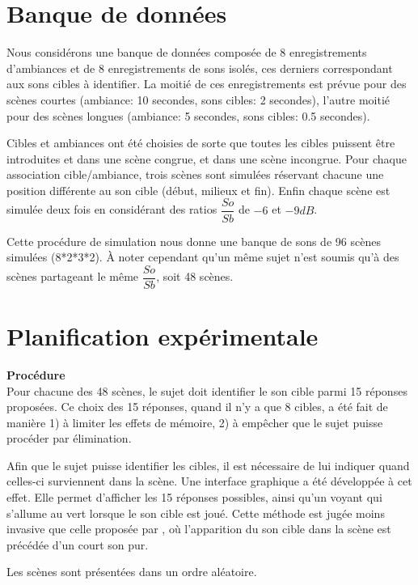 \section{Banque de données}

Nous considérons une banque de données composée de 8 enregistrements d'ambiances et de 8 enregistrements de sons isolés, ces derniers correspondant aux sons cibles à identifier. La moitié de ces enregistrements est prévue pour des scènes courtes (ambiance: 10 secondes, sons cibles: 2 secondes), l'autre moitié pour des scènes longues (ambiance: 5 secondes, sons cibles: 0.5 secondes).

Cibles et ambiances ont été choisies de sorte que toutes les cibles puissent être introduites et dans une scène congrue, et dans une scène incongrue. Pour chaque association cible/ambiance, trois scènes sont simulées réservant chacune une position différente au son cible (début, milieux et fin). Enfin chaque scène est simulée deux fois en considérant des ratios $\dfrac{So}{Sb}$ de $-6$ et $-9dB$.

Cette procédure de simulation nous donne une banque de sons de 96 scènes simulées (8*2*3*2). À noter cependant qu'un même sujet n'est soumis qu'à des scènes partageant le même $\dfrac{So}{Sb}$, soit 48 scènes.


\section{Planification expérimentale}

{\setlength{\parindent}{0cm}\textbf{Procédure}} \\ 

Pour chacune des 48 scènes, le sujet doit identifier le son cible parmi 15 réponses proposées. Ce choix des 15 réponses, quand il n'y a que 8 cibles, a été fait de manière 1) à limiter les effets de mémoire, 2) à empêcher que le sujet puisse procéder par élimination.

Afin que le sujet puisse identifier les cibles, il est nécessaire de lui indiquer quand celles-ci surviennent dans la scène. Une interface graphique a été développée à cet effet. Elle permet d'afficher les 15 réponses possibles, ainsi qu'un voyant qui s'allume au vert lorsque le son cible est joué. Cette méthode est jugée moins invasive que celle proposée par \citep{gygi2011incongruency}, où l’apparition du son cible dans la scène est précédée d'un court son pur.

Les scènes sont présentées dans un ordre aléatoire. \\

